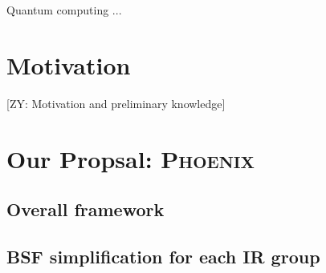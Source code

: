 \documentclass[conference]{IEEEtran}
\newcommand{\ZY}[1]{{\color{purple}[ZY: #1]}}
\newcommand{\phoenix}{\textsc{Phoenix}}
\begin{document}
    Quantum computing ...
    







\section{Motivation}

\ZY{Motivation and preliminary knowledge}


\section{Our Propsal: \phoenix}

\subsection{Overall framework}

\subsection{BSF simplification for each IR group}
\end{document}
